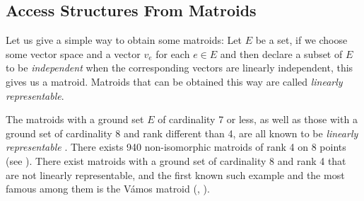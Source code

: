 \documentclass[11pt, a4paper]{kybernetika}
\begin{document}
	\subsection{Access Structures From Matroids}\label{s:mat}
	
	Let us give a simple way to obtain some matroids: Let $E$ be a set, if we choose some vector space and a vector $v_e$ for each $e\in E$ and then declare a subset of $E$ to be \emph{independent} when the corresponding vectors are linearly independent, this gives us a matroid. Matroids that can be obtained this way are called \emph{linearly representable}.
	
	The matroids with a ground set $E$ of cardinality 7 or less, as well as those with a ground set of cardinality 8 and rank different than 4, are all known to be \emph{linearly representable} \cite{fournier1971representation}. There exists 940 non-isomorphic matroids of rank 4 on 8 points (see \cite{oxley1992matroid}). There exist matroids with a ground set of cardinality 8 and rank 4 that are not linearly representable, and the first known such example and the most famous among them is the V\'amos matroid (\cite{vamos1968representation}, \cite[Proposition~2.2.26]{oxley1992matroid}).
\end{document}
